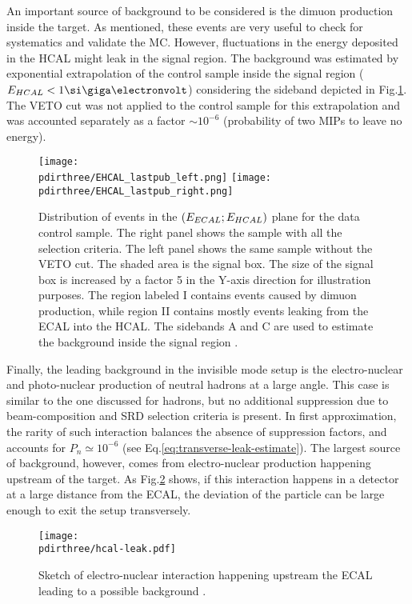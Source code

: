 An important source of background to be considered is the dimuon production inside the target. As mentioned, these events are very useful to check for systematics and validate the MC. However, fluctuations in the energy deposited in the HCAL might leak in the signal region. The background was estimated by exponential extrapolation of the control sample inside the signal region ($E_{HCAL} < 1 \gev$) considering the sideband depicted in Fig.\ref{fig:ehcal-bkg-bands}. The VETO cut was not applied to the control sample for this extrapolation and was accounted separately as a factor $\sim 10^{-6}$ (probability of two MIPs to leave no energy).

\begin{figure}[bth!]
  \centering
  \texttt{[image: \\pdirthree/EHCAL\_lastpub\_left.png]}
  \texttt{[image: \\pdirthree/EHCAL\_lastpub\_right.png]}
  \caption[ECAL vs HCAL events band]{Distribution of events in the $(E_{ECAL};E_{HCAL})$ plane for the data control sample. The right panel shows the sample with all the selection criteria. The left panel shows the same sample without the VETO cut. The shaded area is the signal box. The size of the signal box is increased by a factor 5 in the Y-axis direction for illustration purposes. The region labeled I contains events caused by dimuon production, while region II contains mostly events leaking from the ECAL into the HCAL. The sidebands A and C are used to estimate the background inside the signal region \cite{NA64:2019imj}.}
  \label{fig:ehcal-bkg-bands}
\end{figure}

Finally, the leading background in the invisible mode setup is the electro-nuclear and photo-nuclear production of neutral hadrons at a large angle. This case is similar to the one discussed for hadrons, but no additional suppression due to beam-composition and SRD selection criteria is present. In first approximation, the rarity of such interaction balances the absence of suppression factors, and accounts for $P_n \simeq 10^{-6}$ (see Eq.\ref{eq:transverse-leak-estimate}).
The largest source of background, however, comes from electro-nuclear production happening upstream of the target. As Fig.\ref{fig:eh-prod-sketch} shows, if this interaction happens in a detector at a large distance from the ECAL, the deviation of the particle can be large enough to exit the setup transversely. 


\begin{figure}[bth!]
  \centering
  \texttt{[image: \\pdirthree/hcal-leak.pdf]}
  \caption[upstream electro-hadron production upstream]{Sketch of electro-nuclear interaction happening upstream the ECAL leading to a possible background \cite{pdegen-thesis}.}
  \label{fig:eh-prod-sketch}
\end{figure}

